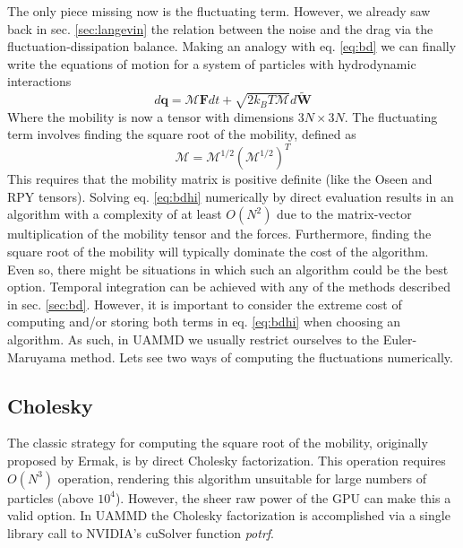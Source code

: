 \documentclass[ twoside,openright,titlepage,numbers=noenddot,%
headinclude,footinclude,cleardoublepage=empty,abstract=on,
BCOR=5mm,paper=a4,fontsize=11pt, dvipsnames
]{scrreprt}
\renewcommand{\vec}[1]{\bm{#1}}
\newcommand{\tens}[1]{\bm{\mathcal{#1}}}
\newcommand{\uammd}{\gls{UAMMD}\xspace}
\newcommand{\gpu}{\gls{GPU}\xspace}
\newcommand{\kT}{k_B T}
\newcommand{\ppos}{q}
\begin{document}
The only piece missing now is the fluctuating term. However, we already saw back in sec. \ref{sec:langevin} the relation between the noise and the drag via the fluctuation-dissipation balance. Making an analogy with eq. \eqref{eq:bd} we can finally write the equations of motion for a system of particles with hydrodynamic interactions
\begin{equation}
  \label{eq:bdhi}
  d\vec{\ppos} = \tens{M}\vec{F}dt + \sqrt{2\kT \tens{M}}d\vec{\widetilde{W}}
\end{equation}
Where the mobility is now a tensor with dimensions $3N\times 3N$. The fluctuating term involves finding the square root of the mobility, defined as
\begin{equation}
  \tens{M} = \tens{M}^{1/2}\left(\tens{M}^{1/2}\right)^T
\end{equation}
This requires that the mobility matrix is positive definite (like the Oseen and \gls{RPY} tensors).
Solving eq. \eqref{eq:bdhi} numerically by direct evaluation results in an algorithm with a complexity of at least $O(N^2)$ due to the matrix-vector multiplication of the mobility tensor and the forces. Furthermore, finding the square root of the mobility will typically dominate the cost of the algorithm. Even so, there might be situations in which such an algorithm could be the best option.
Temporal integration can be achieved with any of the methods described in sec. \ref{sec:bd}. However, it is important to consider the extreme cost of computing and/or storing both terms in eq. \eqref{eq:bdhi} when choosing an algorithm. As such, in \uammd we usually restrict ourselves to the Euler-Maruyama method.
Lets see two ways of computing the fluctuations numerically.
\subsection{Cholesky}
The classic strategy for computing the square root of the mobility, originally proposed by Ermak\cite{Ermak1978}, is by direct Cholesky factorization. This operation requires $O(N^3)$ operation, rendering this algorithm unsuitable for large numbers of particles (above $10^4$). However, the sheer raw power of the \gpu can make this a valid option. In \uammd the Cholesky factorization is accomplished via a single library call to NVIDIA's cuSolver function \emph{potrf}.
\end{document}
